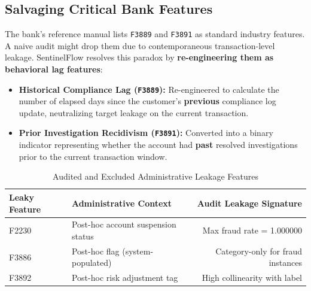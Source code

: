 \documentclass[11pt,a4paper]{article}
\begin{document}
\subsection*{Salvaging Critical Bank Features}
The bank's reference manual lists \texttt{F3889} and \texttt{F3891} as standard industry features. A naive audit might drop them due to contemporaneous transaction-level leakage. SentinelFlow resolves this paradox by \textbf{re-engineering them as behavioral lag features}:
\begin{itemize}
  \item \textbf{Historical Compliance Lag (\texttt{F3889}):} Re-engineered to calculate the number of elapsed days since the customer's \textbf{previous} compliance log update, neutralizing target leakage on the current transaction.
  \item \textbf{Prior Investigation Recidivism (\texttt{F3891}):} Converted into a binary indicator representing whether the account had \textbf{past} resolved investigations prior to the current transaction window.
\end{itemize}

\begin{table}[H]
\centering
\caption{Audited and Excluded Administrative Leakage Features}\label{tab:leaky}
\begin{tabular}{lp{8cm}r}
\toprule
\textbf{Leaky Feature} & \textbf{Administrative Context} & \textbf{Audit Leakage Signature} \\
\midrule
F2230 & Post-hoc account suspension status & Max fraud rate = 1.000000 \\
F3886 & Post-hoc flag (system-populated) & Category-only for fraud instances \\
F3892 & Post-hoc risk adjustment tag & High collinearity with label \\
\bottomrule
\end{tabular}
\end{table}
\end{document}
